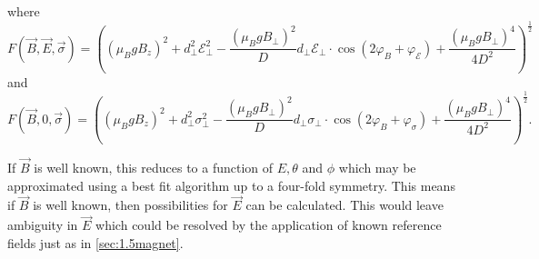 where
\begin{equation}
	F(\vec{B},\vec{E},\vec{\sigma}) = \left((\mu_B g B_z)^2 + d_\perp^2 \mathcal{E}_\perp^2 - \frac{(\mu_B g B_\perp)^2}{D} d_\perp \mathcal{E}_\perp \cdot \cos(2 \varphi_B + \varphi_\mathcal{E}) + \frac{(\mu_B g B_\perp)^4}{4D^2}  \right)^{\frac{1}{2}}
	\label{eq:}
\end{equation}
and
\begin{equation}
	F(\vec{B},0,\vec{\sigma}) = \left((\mu_B g B_z)^2 + d_\perp^2 \sigma_\perp^2 - \frac{(\mu_B g B_\perp)^2}{D} d_\perp \sigma_\perp \cdot \cos(2 \varphi_B + \varphi_\sigma) + \frac{(\mu_B g B_\perp)^4}{4D^2}  \right)^{\frac{1}{2}}.
	\label{eq:}
\end{equation}

%
If $\vec{B}$ is well known, this reduces to a function of $E, \theta$ and $\phi$ which may be approximated using a best fit algorithm up to a four-fold symmetry.
This means if $\vec{B}$ is well known, then possibilities for $\vec{E}$ can be calculated. This would leave ambiguity in $\vec{E}$ which could be resolved by the application of known reference fields just as in \ref{sec:1.5magnet}.



%

